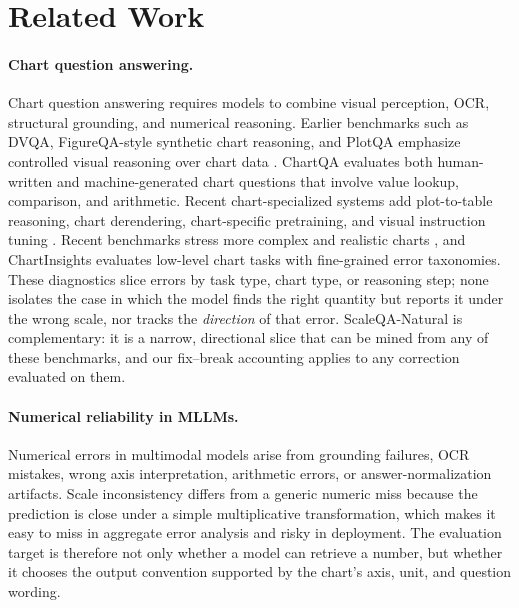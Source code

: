\section{Related Work}

\paragraph{Chart question answering.}
Chart question answering requires models to combine visual perception, OCR, structural grounding, and numerical reasoning. Earlier benchmarks such as DVQA, FigureQA-style synthetic chart reasoning, and PlotQA emphasize controlled visual reasoning over chart data \citep{kafle2018dvqa,methani2020plotqa}. ChartQA \citep{masry2022chartqa} evaluates both human-written and machine-generated chart questions that involve value lookup, comparison, and arithmetic. Recent chart-specialized systems add plot-to-table reasoning, chart derendering, chart-specific pretraining, and visual instruction tuning \citep{liu2023deplot,liu2023matcha,masry2023unichart,han2023chartllama,masry2024chartgemma}. Recent benchmarks stress more complex and realistic charts \citep{chartbench2024,wang2024charxiv,masry2025chartqapro,wei2025chartmind}, and ChartInsights \citep{wu2024chartinsights} evaluates low-level chart tasks with fine-grained error taxonomies. These diagnostics slice errors by task type, chart type, or reasoning step; none isolates the case in which the model finds the right quantity but reports it under the wrong scale, nor tracks the \emph{direction} of that error. ScaleQA-Natural is complementary: it is a narrow, directional slice that can be mined from any of these benchmarks, and our fix--break accounting applies to any correction evaluated on them.

\paragraph{Numerical reliability in MLLMs.}
Numerical errors in multimodal models arise from grounding failures, OCR mistakes, wrong axis interpretation, arithmetic errors, or answer-normalization artifacts. Scale inconsistency differs from a generic numeric miss because the prediction is close under a simple multiplicative transformation, which makes it easy to miss in aggregate error analysis and risky in deployment. The evaluation target is therefore not only whether a model can retrieve a number, but whether it chooses the output convention supported by the chart's axis, unit, and question wording.

